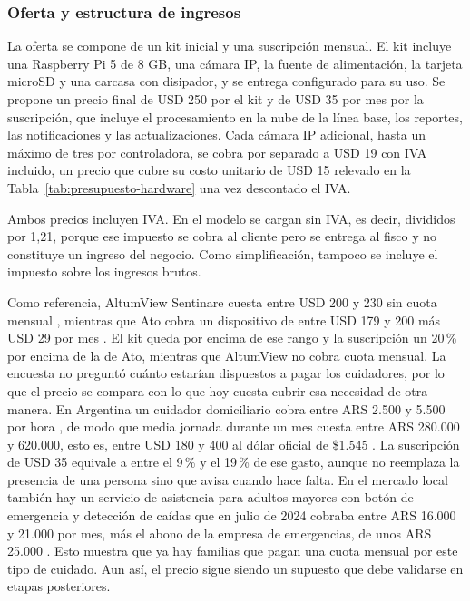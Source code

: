 \subsubsection{Oferta y estructura de ingresos}
\label{sec:oferta-ingresos}

La oferta se compone de un kit inicial y una suscripción mensual.
El kit incluye una Raspberry Pi 5 de 8 GB, una cámara IP, la fuente de alimentación, la tarjeta microSD y una carcasa con disipador, y se entrega configurado para su uso.
Se propone un precio final de USD 250 por el kit y de USD 35 por mes por la suscripción, que incluye el procesamiento en la nube de la línea base, los reportes, las notificaciones y las actualizaciones.
Cada cámara IP adicional, hasta un máximo de tres por controladora, se cobra por separado a USD 19 con IVA incluido, un precio que cubre su costo unitario de USD 15 relevado en la Tabla~\ref{tab:presupuesto-hardware} una vez descontado el IVA.

Ambos precios incluyen IVA.
En el modelo se cargan sin IVA, es decir, divididos por 1,21, porque ese impuesto se cobra al cliente pero se entrega al fisco y no constituye un ingreso del negocio.
Como simplificación, tampoco se incluye el impuesto sobre los ingresos brutos.

Como referencia, AltumView Sentinare cuesta entre USD 200 y 230 sin cuota mensual \parencite{AltumView}, mientras que Ato cobra un dispositivo de entre USD 179 y 200 más USD 29 por mes \parencite{Ato}.
El kit queda por encima de ese rango y la suscripción un 20\,\% por encima de la de Ato, mientras que AltumView no cobra cuota mensual.
La encuesta no preguntó cuánto estarían dispuestos a pagar los cuidadores, por lo que el precio se compara con lo que hoy cuesta cubrir esa necesidad de otra manera.
En Argentina un cuidador domiciliario cobra entre ARS 2.500 y 5.500 por hora \parencite{CuantoMeCuesta2026}, de modo que media jornada durante un mes cuesta entre ARS 280.000 y 620.000, esto es, entre USD 180 y 400 al dólar oficial de \$1.545 \parencite{DolarAPI2026}.
La suscripción de USD 35 equivale a entre el 9\,\% y el 19\,\% de ese gasto, aunque no reemplaza la presencia de una persona sino que avisa cuando hace falta.
En el mercado local también hay un servicio de asistencia para adultos mayores con botón de emergencia y detección de caídas que en julio de 2024 cobraba entre ARS 16.000 y 21.000 por mes, más el abono de la empresa de emergencias, de unos ARS 25.000 \parencite{Infonegocios2024}.
Esto muestra que ya hay familias que pagan una cuota mensual por este tipo de cuidado.
Aun así, el precio sigue siendo un supuesto que debe validarse en etapas posteriores.

